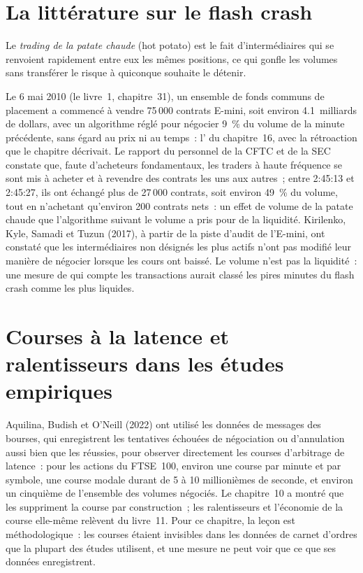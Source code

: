\section{La littérature sur le flash crash}

\begin{definition}\label{def:mx:market-quality-and-regulation:hotpotato}
Le \emph{trading de la patate chaude} (hot potato) est le fait d'intermédiaires qui se renvoient rapidement entre eux les mêmes positions, ce qui
gonfle les volumes sans transférer le risque à quiconque souhaite le détenir.
\end{definition}

Le 6 mai 2010 (le livre~1, chapitre~31), un ensemble de fonds communs de placement a commencé à vendre 75\,000 contrats E-mini, soit environ 4.1~milliards de dollars, avec un algorithme réglé pour
négocier 9~\% du volume de la minute précédente, sans égard au prix ni au temps~: l' du chapitre~16, avec la rétroaction que le chapitre
décrivait. Le rapport du personnel de la CFTC et de la SEC constate que, faute d'acheteurs fondamentaux, les traders à haute fréquence se sont mis à acheter et à revendre des contrats les uns aux
autres~; entre 2:45:13 et 2:45:27, ils ont échangé plus de 27\,000 contrats, soit environ 49~\% du volume, tout en n'achetant qu'environ 200 contrats nets~: un effet de volume de la patate chaude
que l'algorithme suivant le volume a pris pour de la liquidité. Kirilenko, Kyle, Samadi et Tuzun (2017), à partir de la piste d'audit de l'E-mini, ont constaté que les
intermédiaires non désignés les plus actifs n'ont pas modifié leur manière de négocier lorsque les cours ont baissé. Le volume n'est pas la liquidité~: une mesure de  qui
compte les transactions aurait classé les pires minutes du flash crash comme les plus liquides.

\section{Courses à la latence et ralentisseurs dans les études empiriques}

Aquilina, Budish et O'Neill (2022) ont utilisé les données de messages des bourses, qui enregistrent les tentatives échouées de négociation ou d'annulation aussi bien que les réussies, pour observer
directement les courses d'arbitrage de latence~: pour les actions du FTSE~100, environ une course par minute et par symbole, une course modale durant de 5 à 10 millionièmes de seconde, et
environ un cinquième de l'ensemble des volumes négociés. Le chapitre~10 a montré que les  suppriment la course par construction~; les ralentisseurs et l'économie de la course
elle-même relèvent du livre~11. Pour ce chapitre, la leçon est méthodologique~: les courses étaient invisibles dans les données de carnet d'ordres que la plupart des études
utilisent, et une mesure ne peut voir que ce que ses données enregistrent.

